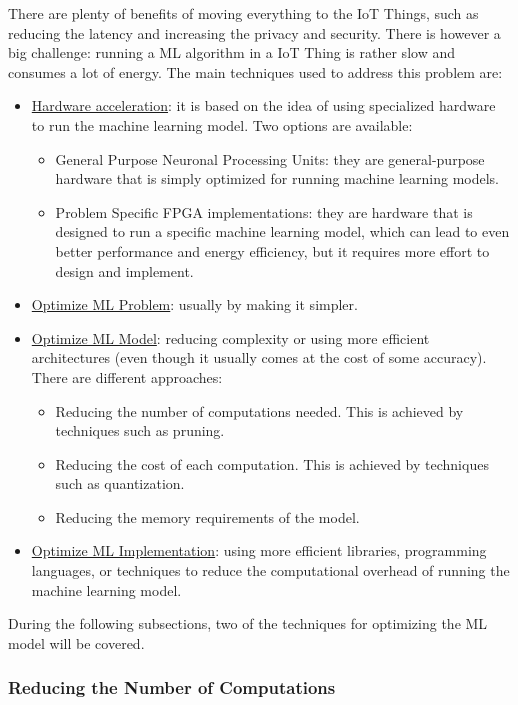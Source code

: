 There are plenty of benefits of moving everything to the IoT Things, such as reducing the latency and increasing the privacy and security. There is however a big challenge: running a ML algorithm in a IoT Thing is rather slow and consumes a lot of energy. The main techniques used to address this problem are:
\begin{itemize}
    \item \ul{Hardware acceleration}: it is based on the idea of using specialized hardware to run the machine learning model. Two options are available:
    \begin{itemize}
        \item General Purpose Neuronal Processing Units: they are general-purpose hardware that is simply optimized for running machine learning models.
        \item Problem Specific FPGA implementations: they are hardware that is designed to run a specific machine learning model, which can lead to even better performance and energy efficiency, but it requires more effort to design and implement.
    \end{itemize}
    \item \ul{Optimize ML Problem}: usually by making it simpler.
    \item \ul{Optimize ML Model}: reducing complexity or using more efficient architectures (even though it usually comes at the cost of some accuracy). There are different approaches:
    \begin{itemize}
        \item Reducing the number of computations needed. This is achieved by techniques such as pruning.
        \item Reducing the cost of each computation. This is achieved by techniques such as quantization.
        \item Reducing the memory requirements of the model.
    \end{itemize}
    \item \ul{Optimize ML Implementation}: using more efficient libraries, programming languages, or techniques to reduce the computational overhead of running the machine learning model.
\end{itemize}


During the following subsections, two of the techniques for optimizing the ML model will be covered.
\subsubsection{Reducing the Number of Computations}

